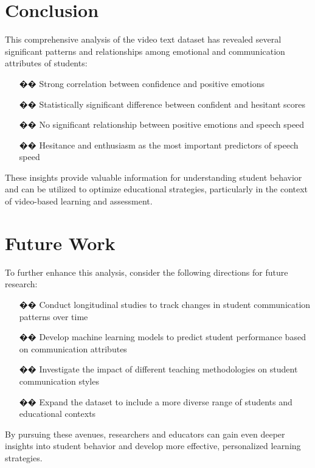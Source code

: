 \documentclass{article}
\begin{document}
\section{Conclusion}
This comprehensive analysis of the video text dataset has revealed several significant patterns and relationships among emotional and communication attributes of students:

\begin{enumerate}
    \item [\textcolor{accentColor1}{��}] Strong correlation between confidence and positive emotions
    \item [\textcolor{accentColor2}{��}] Statistically significant difference between confident and hesitant scores
    \item [\textcolor{accentColor3}{��️}] No significant relationship between positive emotions and speech speed
    \item [\textcolor{primaryColor}{��}] Hesitance and enthusiasm as the most important predictors of speech speed
\end{enumerate}

These insights provide valuable information for understanding student behavior and can be utilized to optimize educational strategies, particularly in the context of video-based learning and assessment.

\section{Future Work}
To further enhance this analysis, consider the following directions for future research:

\begin{enumerate}
    \item [\textcolor{accentColor1}{��}] Conduct longitudinal studies to track changes in student communication patterns over time
    \item [\textcolor{accentColor2}{��}] Develop machine learning models to predict student performance based on communication attributes
    \item [\textcolor{accentColor3}{��}] Investigate the impact of different teaching methodologies on student communication styles
    \item [\textcolor{primaryColor}{��}] Expand the dataset to include a more diverse range of students and educational contexts
\end{enumerate}

By pursuing these avenues, researchers and educators can gain even deeper insights into student behavior and develop more effective, personalized learning strategies.
\end{document}
